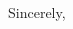 \documentclass[11pt]{article}%
\begin{document}
\begin{multicols}{2}
\lipsum[1-6]
\end{multicols}

\begin{paracol}{2}\switchcolumn
Sincerely,

 \docfrom \\
 \doctitle\vspace{3ex}

\end{paracol}
\end{document}
